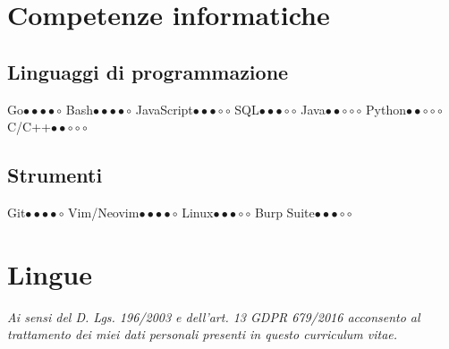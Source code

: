\section{Competenze informatiche}

\subsection{Linguaggi di programmazione}
\cvcomputer
{Go}{\( \bullet \bullet \bullet \bullet \circ \)}
{Bash}{\( \bullet \bullet \bullet \bullet \circ \)}
\cvcomputer
{JavaScript}{\( \bullet \bullet \bullet \circ \circ \)}
{SQL}{\( \bullet \bullet \bullet \circ \circ \)}
\cvcomputer
{Java}{\( \bullet \bullet \circ \circ \circ \)}
{Python}{\( \bullet \bullet \circ \circ \circ \)}
\cvcomputer
{C/C++}{\( \bullet \bullet \circ \circ \circ \)}
{}{}

\subsection{Strumenti}
\cvcomputer
{Git}{\( \bullet \bullet \bullet \bullet \circ \)}
{Vim/Neovim}{\( \bullet \bullet \bullet \bullet \circ \)}
\cvcomputer
{Linux}{\( \bullet \bullet \bullet \circ \circ \)}
{Burp Suite}{\( \bullet \bullet \bullet \circ \circ \)}

\section{Lingue}

\emptysection{}\closesection
\vfill
\begin{center}
    \textit{Ai sensi del D. Lgs. 196/2003 e dell'art. 13 GDPR 679/2016
    acconsento al trattamento dei miei dati personali presenti in questo
    curriculum vitae.}
\end{center}


